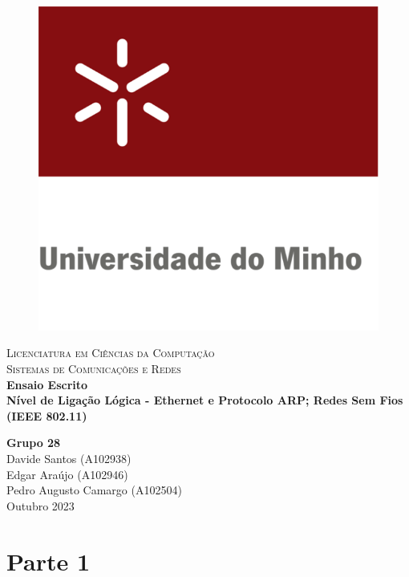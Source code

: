 \documentclass{article}
\begin{document}
\begin{titlepage}

\center %

\newcommand{\HRule}{\rule{\linewidth}{0.4mm}} %

\begin{figure}[h]
    \centering
    \includegraphics[width=0.24\linewidth]{images/uniMinho.jpg}
\end{figure}

\textsc{\Large Licenciatura em Ciências da Computação}\\[0.4cm] %
\textsc{\Large Sistemas de Comunicações e Redes}\\[5cm]

{\Large\bfseries Ensaio Escrito}\\[0.5cm]
{\LARGE \bfseries   Nível de Ligação Lógica - Ethernet e Protocolo ARP; Redes Sem Fios (IEEE 802.11)} %


\vspace{5cm} %
{\bfseries Grupo 28} \\ \vspace{3mm}
Davide Santos (A102938) \\ \vspace{3mm}
Edgar Araújo (A102946) \\ \vspace{3mm}
Pedro Augusto Camargo (A102504) \\ \vspace{3mm}
\vspace{0.2cm}
{Outubro 2023}\\[0.2cm] %

\vfill %
\end{titlepage}

\tableofcontents
\pagebreak

\section{Parte 1}
\end{document}
